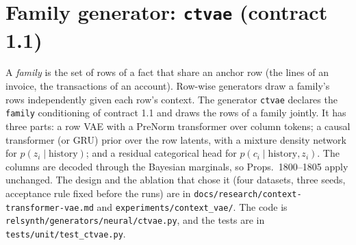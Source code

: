 \section{Family generator: \texttt{ctvae} (contract 1.1)}\label{sec:v74ctvae}
\setcounter{savedpropctvae}{\value{proposition}}
A \emph{family} is the set of rows of a fact that share an anchor row (the lines of an invoice, the transactions of an account). Row-wise generators draw a family's rows independently given each row's context. The generator \texttt{ctvae} declares the \texttt{family} conditioning of contract 1.1 and draws the rows of a family jointly. It has three parts: a row VAE with a PreNorm transformer over column tokens; a causal transformer (or GRU) prior over the row latents, with a mixture density network for $p(z_i\mid\text{history})$; and a residual categorical head for $p(c_i\mid\text{history},z_i)$. The columns are decoded through the Bayesian marginals, so Props.~1800--1805 apply unchanged. The design and the ablation that chose it (four datasets, three seeds, acceptance rule fixed before the runs) are in \texttt{docs/research/context-transformer-vae.md} and \texttt{experiments/context\_vae/}. The code is \texttt{relsynth/generators/neural/ctvae.py}, and the tests are in \texttt{tests/unit/test\_ctvae.py}.

